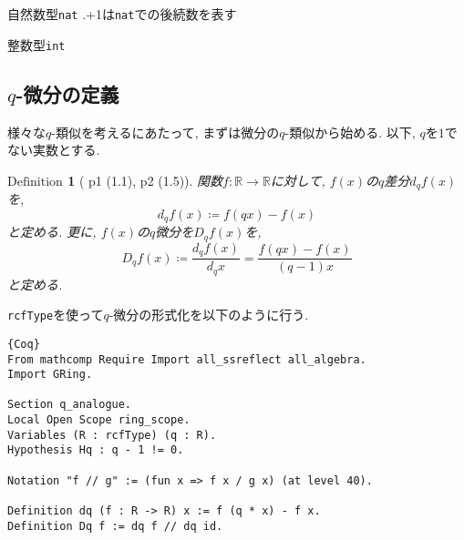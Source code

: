 \documentclass[11pt]{jsreport}
\theoremstyle{mystyle}
\newtheorem{df}{$\textrm{Definition}$}[subsection]
\newcommand{\bdf}{\begin{shadebox} \begin{df}}
\newcommand{\edf}{\end{df} \end{shadebox}}
\newcommand{\R}{\mathbb{R}}
\newcommand{\0}{\textbf{0}}
\newcommand{\1}{\textbf{1}}
\newcommand{\2}{\textbf{2}}
\begin{document}
自然数型{\tt nat}
{.+1}は{\tt nat}での後続数を表す

整数型{\tt int}
\subsection{$q$-微分の定義}
様々な$q$-類似を考えるにあたって, まずは微分の$q$-類似から始める. 以下, $q$を$1$でない実数とする. 
\bdf[\cite{Kac} p1 (1.1), p2 (1.5)]
  関数$f : \R \to \R$に対して, $f(x)$の$q$差分$d_q f(x)$を, 
  \[
    d_q f(x) \coloneqq f (qx) - f(x)
  \]
  と定める. 更に, $f(x)$の$q$微分を$D_q f(x)$を, 
  \[
    D_q f(x) \coloneqq \frac{d_q f(x)}{d_q x} = \frac{f(qx) - f(x)}{(q - 1) x}
  \]
  と定める. 
\edf
{\tt rcfType}を使って$q$-微分の形式化を以下のように行う. 
\begin{lstlisting}{Coq}
From mathcomp Require Import all_ssreflect all_algebra.
Import GRing.

Section q_analogue.
Local Open Scope ring_scope.
Variables (R : rcfType) (q : R).
Hypothesis Hq : q - 1 != 0.

Notation "f // g" := (fun x => f x / g x) (at level 40).

Definition dq (f : R -> R) x := f (q * x) - f x.
Definition Dq f := dq f // dq id. \end{lstlisting}
\end{document}
